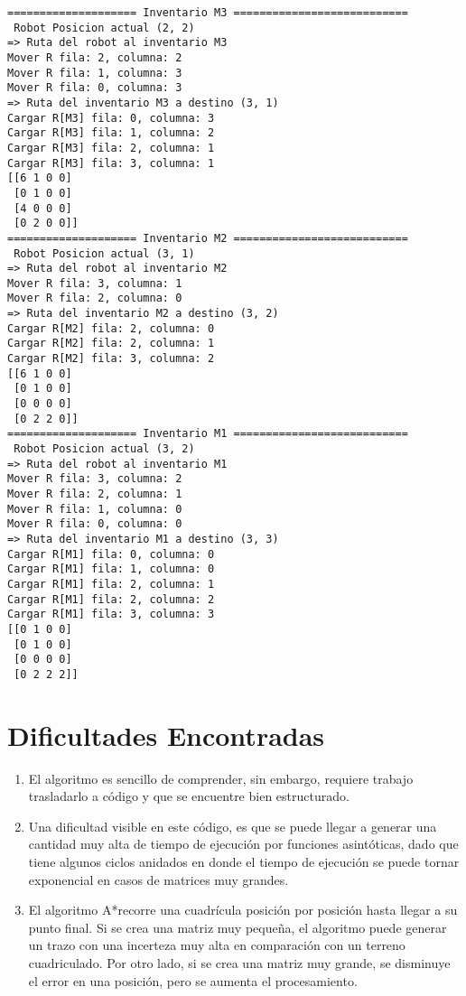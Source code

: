\documentclass[11pt]{article}
\providecommand{\tightlist}{%
      \setlength{\itemsep}{0pt}\setlength{\parskip}{0pt}}
\begin{document}
    \begin{Verbatim}[commandchars=\\\{\}]
==================== Inventario M3 ===========================
 Robot Posicion actual (2, 2)
=> Ruta del robot al inventario M3
Mover R fila: 2, columna: 2
Mover R fila: 1, columna: 3
Mover R fila: 0, columna: 3
=> Ruta del inventario M3 a destino (3, 1)
Cargar R[M3] fila: 0, columna: 3
Cargar R[M3] fila: 1, columna: 2
Cargar R[M3] fila: 2, columna: 1
Cargar R[M3] fila: 3, columna: 1
[[6 1 0 0]
 [0 1 0 0]
 [4 0 0 0]
 [0 2 0 0]]
==================== Inventario M2 ===========================
 Robot Posicion actual (3, 1)
=> Ruta del robot al inventario M2
Mover R fila: 3, columna: 1
Mover R fila: 2, columna: 0
=> Ruta del inventario M2 a destino (3, 2)
Cargar R[M2] fila: 2, columna: 0
Cargar R[M2] fila: 2, columna: 1
Cargar R[M2] fila: 3, columna: 2
[[6 1 0 0]
 [0 1 0 0]
 [0 0 0 0]
 [0 2 2 0]]
==================== Inventario M1 ===========================
 Robot Posicion actual (3, 2)
=> Ruta del robot al inventario M1
Mover R fila: 3, columna: 2
Mover R fila: 2, columna: 1
Mover R fila: 1, columna: 0
Mover R fila: 0, columna: 0
=> Ruta del inventario M1 a destino (3, 3)
Cargar R[M1] fila: 0, columna: 0
Cargar R[M1] fila: 1, columna: 0
Cargar R[M1] fila: 2, columna: 1
Cargar R[M1] fila: 2, columna: 2
Cargar R[M1] fila: 3, columna: 3
[[0 1 0 0]
 [0 1 0 0]
 [0 0 0 0]
 [0 2 2 2]]
    \end{Verbatim}

    \hypertarget{dificultades-encontradas}{%
\section{Dificultades Encontradas}\label{dificultades-encontradas}}

\begin{enumerate}
\def\labelenumi{\arabic{enumi}.}
\tightlist
\item
  El algoritmo es sencillo de comprender, sin embargo, requiere trabajo
  trasladarlo a código y que se encuentre bien estructurado.
\item
  Una dificultad visible en este código, es que se puede llegar a
  generar una cantidad muy alta de tiempo de ejecución por funciones
  asintóticas, dado que tiene algunos ciclos anidados en donde el tiempo
  de ejecución se puede tornar exponencial en casos de matrices muy
  grandes.
\item
  El algoritmo A*recorre una cuadrícula posición por posición hasta
  llegar a su punto final. Si se crea una matriz muy pequeña, el
  algoritmo puede generar un trazo con una incerteza muy alta en
  comparación con un terreno cuadriculado. Por otro lado, si se crea una
  matriz muy grande, se disminuye el error en una posición, pero se
  aumenta el procesamiento.
\end{enumerate}
\end{document}
